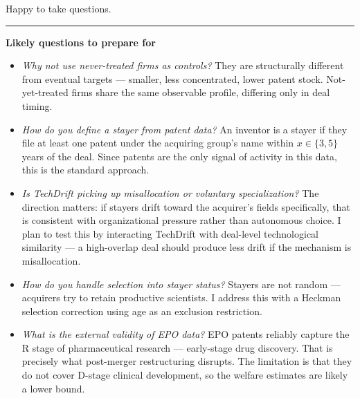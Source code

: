 \documentclass[11pt,a4paper]{article}
\begin{document}
Happy to take questions.

\vspace{1.5em}
\textcolor{darkblue!30}{\hrule}
\vspace{0.8em}
{\small\color{midgray}\textbf{Likely questions to prepare for}}

\begin{itemize}[leftmargin=1.5em, itemsep=0.5em]\small
  \item \textit{Why not use never-treated firms as controls?} They are structurally different from eventual targets --- smaller, less concentrated, lower patent stock. Not-yet-treated firms share the same observable profile, differing only in deal timing.
  \item \textit{How do you define a stayer from patent data?} An inventor is a stayer if they file at least one patent under the acquiring group's name within $x \in \{3,5\}$ years of the deal. Since patents are the only signal of activity in this data, this is the standard approach.
  \item \textit{Is TechDrift picking up misallocation or voluntary specialization?} The direction matters: if stayers drift toward the acquirer's fields specifically, that is consistent with organizational pressure rather than autonomous choice. I plan to test this by interacting TechDrift with deal-level technological similarity --- a high-overlap deal should produce less drift if the mechanism is misallocation.
  \item \textit{How do you handle selection into stayer status?} Stayers are not random --- acquirers try to retain productive scientists. I address this with a Heckman selection correction using age as an exclusion restriction.
  \item \textit{What is the external validity of EPO data?} EPO patents reliably capture the R stage of pharmaceutical research --- early-stage drug discovery. That is precisely what post-merger restructuring disrupts. The limitation is that they do not cover D-stage clinical development, so the welfare estimates are likely a lower bound.
\end{itemize}
\end{document}
